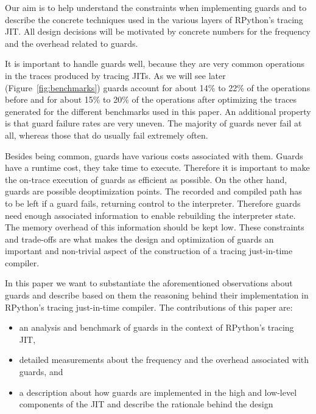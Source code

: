 \documentclass[10pt,preprint]{sigplanconf}
\begin{document}
Our aim is to help understand the constraints when implementing guards
and to describe the concrete techniques used in the various layers of RPython's
tracing JIT. All design decisions will be motivated by concrete numbers for the
frequency and the overhead related to guards.

It is important to handle guards well, because they are very common operations
in the traces produced by tracing JITs. As we will see later (Figure~\ref{fig:benchmarks})
guards account for about 14\% to 22\% of the
operations before and for about 15\% to 20\% of the operations after optimizing
the traces generated for the different benchmarks used in this paper. An
additional property is that guard failure rates are very uneven. The majority
of guards never fail at all, whereas those that do usually fail extremely
often.

Besides being common, guards have various costs associated with them.
Guards have a runtime cost, they take time to execute. Therefore it is
important to make the on-trace execution of guards as efficient as possible. On
the other hand, guards are possible deoptimization points. The recorded and
compiled path has to be left if a guard fails, returning control to the
interpreter. Therefore guards need enough associated information to enable
rebuilding the interpreter state. The memory overhead of this information
should be kept low. These constraints and trade-offs are what makes the design
and optimization of guards an important and non-trivial aspect of the construction
of a tracing just-in-time compiler.

In this paper we want to substantiate the aforementioned observations about guards and
describe based on them the reasoning behind their implementation in
RPython's tracing just-in-time compiler. The contributions of this paper are:
\begin{itemize}
  \item an analysis and benchmark of guards in the context of RPython's tracing JIT,
  \item detailed measurements about the frequency and the
  overhead associated with guards, and
  \item a description about how guards are implemented in the high\-
  and low-level components of the JIT and describe the rationale behind the design
\end{itemize}
\end{document}
